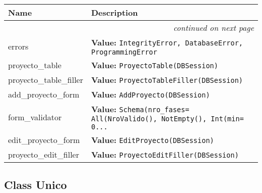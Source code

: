     \vspace{-1cm}
\hspace{\varindent}\begin{longtable}{|p{\varnamewidth}|p{\vardescrwidth}|l}
\cline{1-2}
\cline{1-2} \centering \textbf{Name} & \centering \textbf{Description}& \\
\cline{1-2}
\endhead\cline{1-2}\multicolumn{3}{r}{\small\textit{continued on next page}}\\\endfoot\cline{1-2}
\endlastfoot\raggedright e\-r\-r\-o\-r\-s\- & \raggedright \textbf{Value:} 
{\tt IntegrityError, DatabaseError, ProgrammingError}&\\
\cline{1-2}
\raggedright p\-r\-o\-y\-e\-c\-t\-o\-\_\-t\-a\-b\-l\-e\- & \raggedright \textbf{Value:} 
{\tt ProyectoTable(DBSession)}&\\
\cline{1-2}
\raggedright p\-r\-o\-y\-e\-c\-t\-o\-\_\-t\-a\-b\-l\-e\-\_\-f\-i\-l\-l\-e\-r\- & \raggedright \textbf{Value:} 
{\tt ProyectoTableFiller(DBSession)}&\\
\cline{1-2}
\raggedright a\-d\-d\-\_\-p\-r\-o\-y\-e\-c\-t\-o\-\_\-f\-o\-r\-m\- & \raggedright \textbf{Value:} 
{\tt AddProyecto(DBSession)}&\\
\cline{1-2}
\raggedright f\-o\-r\-m\-\_\-v\-a\-l\-i\-d\-a\-t\-o\-r\- & \raggedright \textbf{Value:} 
{\tt Schema(nro\_fases= All(NroValido(), NotEmpty(), Int(min= 0\texttt{...}}&\\
\cline{1-2}
\raggedright e\-d\-i\-t\-\_\-p\-r\-o\-y\-e\-c\-t\-o\-\_\-f\-o\-r\-m\- & \raggedright \textbf{Value:} 
{\tt EditProyecto(DBSession)}&\\
\cline{1-2}
\raggedright p\-r\-o\-y\-e\-c\-t\-o\-\_\-e\-d\-i\-t\-\_\-f\-i\-l\-l\-e\-r\- & \raggedright \textbf{Value:} 
{\tt ProyectoEditFiller(DBSession)}&\\
\cline{1-2}
\end{longtable}



\subsection{Class Unico}

